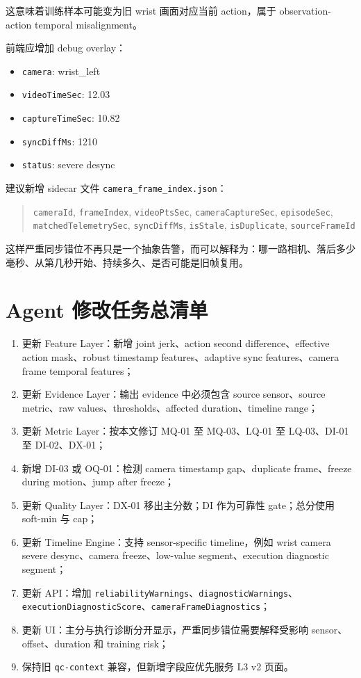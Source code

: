 \documentclass[UTF8,zihao=-4]{ctexart}
\newcommand{\Code}[1]{\texttt{#1}}
\begin{document}
这意味着训练样本可能变为旧 wrist 画面对应当前 action，属于 observation-action temporal misalignment。

前端应增加 debug overlay：

\begin{itemize}
\item \Code{camera}: wrist\_left
\item \Code{videoTimeSec}: 12.03
\item \Code{captureTimeSec}: 10.82
\item \Code{syncDiffMs}: 1210
\item \Code{status}: severe desync
\end{itemize}

建议新增 sidecar 文件 \Code{camera\_frame\_index.json}：

\begin{quote}\small
\Code{cameraId}, \Code{frameIndex}, \Code{videoPtsSec}, \Code{cameraCaptureSec}, \Code{episodeSec}, \Code{matchedTelemetrySec}, \Code{syncDiffMs}, \Code{isStale}, \Code{isDuplicate}, \Code{sourceFrameId}
\end{quote}

这样严重同步错位不再只是一个抽象告警，而可以解释为：哪一路相机、落后多少毫秒、从第几秒开始、持续多久、是否可能是旧帧复用。

\section{Agent 修改任务总清单}

\begin{enumerate}
\item 更新 Feature Layer：新增 joint jerk、action second difference、effective action mask、robust timestamp features、adaptive sync features、camera frame temporal features；
\item 更新 Evidence Layer：输出 evidence 中必须包含 source sensor、source metric、raw values、thresholds、affected duration、timeline range；
\item 更新 Metric Layer：按本文修订 MQ-01 至 MQ-03、LQ-01 至 LQ-03、DI-01 至 DI-02、DX-01；
\item 新增 DI-03 或 OQ-01：检测 camera timestamp gap、duplicate frame、freeze during motion、jump after freeze；
\item 更新 Quality Layer：DX-01 移出主分数；DI 作为可靠性 gate；总分使用 soft-min 与 cap；
\item 更新 Timeline Engine：支持 sensor-specific timeline，例如 wrist camera severe desync、camera freeze、low-value segment、execution diagnostic segment；
\item 更新 API：增加 \Code{reliabilityWarnings}、\Code{diagnosticWarnings}、\Code{executionDiagnosticScore}、\Code{cameraFrameDiagnostics}；
\item 更新 UI：主分与执行诊断分开显示，严重同步错位需要解释受影响 sensor、offset、duration 和 training risk；
\item 保持旧 \Code{qc-context} 兼容，但新增字段应优先服务 L3 v2 页面。
\end{enumerate}
\end{document}
